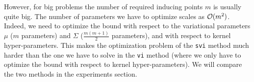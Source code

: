 However, for big problems the number of required inducing points $m$ is usually quite big. The number of parameters we have to optimize scales as $\mathcal{O}(m^2)$. Indeed, we need to optimize the bound with respect to the variational parameters $\mu$ ($m$ parameters) and $\Sigma$ ($\frac {m(m + 1)} 2$ parameters), and with respect to kernel hyper-parameters. This makes the optimization problem of the \lstinline{svi} method much harder than the one we have to solve in the \lstinline{vi} method (where we only have to optimize the bound with respect to kernel hyper-parameters). We will compare the two methods in the experiments section.
